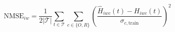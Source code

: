 \documentclass{article}
\begin{document}
\fontsize{22}{29}\selectfont
\[
\mathrm{NMSE}_{iw}=\frac{1}{2|\mathcal T|}\sum_{t\in\mathcal T}\sum_{c\in\{O,R\}}\left(\frac{\hat H_{iwc}(t)-H_{iwc}(t)}{\sigma_{c,\mathrm{train}}}\right)^2
\]
\end{document}
